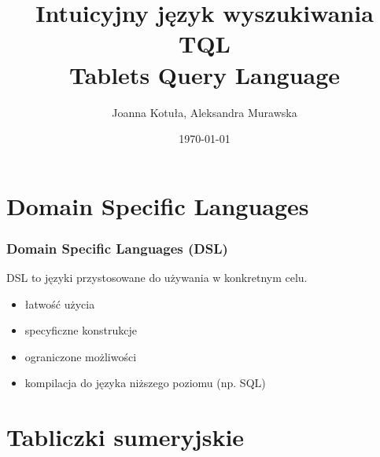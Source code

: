 \documentclass[xcolor=dvipsnames,10pt]{beamer}
\author{Joanna Kotuła, Aleksandra Murawska}
\institute[...]{Wydział Matematyki, Informatyki i Mechaniki\\
Uniwersytet Warszawski}
\title[Intuicyjny język wyszukiwania TQL (Tablets Query Language)]{\bf  Intuicyjny język wyszukiwania TQL \\
Tablets Query Language}
\date{\today}
\begin{document}
\begin{frame}
     \titlepage
\end{frame}




\section{Domain Specific Languages}


\begin{frame}
     \frametitle{Domain Specific Languages (DSL)}
     
     DSL to języki przystosowane do używania w konkretnym celu.
     \begin{itemize}
          \item
          łatwość użycia
          \item
          specyficzne konstrukcje
          \item 
          ograniczone możliwości
          \item
          kompilacja do języka niższego poziomu (np. SQL)
     \end{itemize}


\end{frame}

\section{Tabliczki sumeryjskie}
\end{document}
